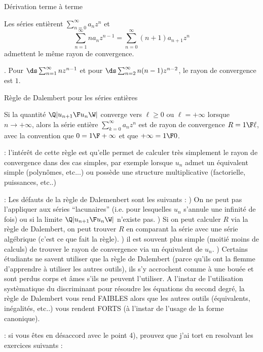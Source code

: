 \Concept [Index=Rayon de convergence!Derivation terme a terme@D\'erivation terme \`a terme] D\'erivation terme \`a terme

Les s\'eries enti\`erent $\sum_{n=0}^\infty a_nz^n$ et 
$$
\sum\limits_{n=1}^\infty na_nz^{n-1}=\sum\limits_{n=0}^\infty(n+1)a_{n+1}z^n
$$ 
admettent le m\^eme rayon de convergence. 

\Exemple. Pour $\ds \sum_{n=1}^\infty nz^{n-1}$ et pour $\ds \sum_{n=2}^\infty n(n-1)z^{n-2}$, 
le rayon de convergence est $1$. 


\Concept R\`egle de Dalembert pour les s\'eries enti\`eres

Si la quantit\'e $\Q|{u_{n+1}\F u_n}\W|$ converge vers $\ell\ge0$ ou $\ell=+\infty$ lorsque $n\to+\infty$, 
alors la s\'erie enti\`ere $\sum_{k=0}^\infty a_nz^n$ est de rayon de convergence $R={1\F \ell}$, avec la convention que $0={1\F+\infty}$ et que $+\infty=1\F 0$. 

\Remarque : l'int\'er\^et de cette r\`egle est qu'elle permet de calculer tr\`es simplement le rayon de convergence dans des cas simples, par exemple lorsque $u_n$ admet un \'equivalent simple (polyn\^omes, etc...) ou poss\`ede une structure multiplicative (factorielle, puissances, etc..)

\Remarque : Les d\'efauts de la r\`egle de Dalemenbert sont les suivants : ) On ne peut pas l'appliquer aux s\'eries ``lacunaires'' (i.e. pour lesquelles $u_n$ s'annule une infinit\'e de fois) ou si la limite $\Q|{u_{n+1}\F u_n}\W|$ n'existe pas. ) Si on peut calculer $R$ via la r\`egle de Dalembert, on peut trouver $R$ en comparant la s\'erie avec une s\'erie alg\'ebrique (c'est ce que fait la r\`egle). ) il est souvent plus simple (moiti\'e moins de calculs) de trouver le rayon de convergence via un \'equivalent de $u_n$. ) Certains \'etudiants ne savent utiliser que la r\`egle de Dalembert (parce qu'ils ont la flemme d'apprendre \`a utiliser les autres outils), ils s'y accrochent comme \`a une bou\'ee et sont perdus corps et \^ames s'ils ne peuvent l'utiliser. 
A l'instar de l'utilisation syst\`ematique du discriminant pour r\'esoudre les \'equations du second degr\'e, 
la r\`egle de Dalembert vous rend FAIBLES alors que les autres outils (\'equivalents, in\'egalit\'es, etc..) vous rendent FORTS (\`a l'instar de l'usage de la forme canonique). 
\bigskip

\Remarque : si vous \^etes en d\'esaccord avec le point 4), prouvez que j'ai tort en resolvant les exercices suivants : 

